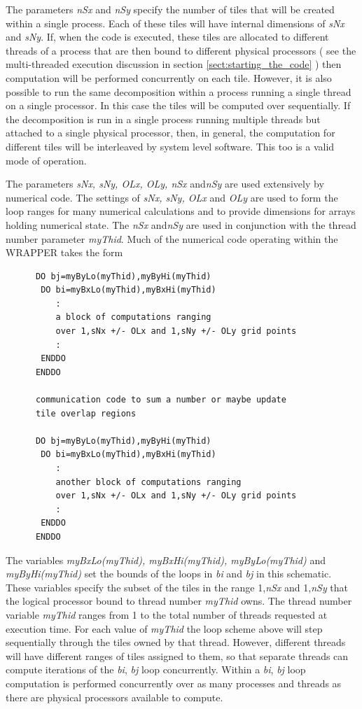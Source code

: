  The parameters {\em nSx} and {\em nSy} specify the number of tiles that will
be created within a single process. Each of these tiles will have internal
dimensions of {\em sNx} and {\em sNy}. If, when the code is executed, these tiles are 
allocated to different threads of a process that are then bound to
different physical processors ( see the multi-threaded
execution discussion in section \ref{sect:starting_the_code} ) then
computation will be performed concurrently on each tile. However, it is also
possible to run the same decomposition within a process running a single thread on
a single processor. In this case the tiles will be computed over sequentially.
If the decomposition is run in a single process running multiple threads
but attached to a single physical processor, then, in general, the computation
for different tiles will be interleaved by system level software.
This too is a valid mode of operation.

 The parameters {\em sNx, sNy, OLx, OLy, nSx} and{\em nSy} are used extensively by
numerical code. The settings of {\em sNx, sNy, OLx} and {\em OLy}
are used to form the loop ranges for many numerical calculations and
to provide dimensions for arrays holding numerical state.
The {\em nSx} and{\em nSy} are used in conjunction with the thread number
parameter {\em myThid}. Much of the numerical code operating within the
WRAPPER takes the form 
\begin{verbatim}
      DO bj=myByLo(myThid),myByHi(myThid)
       DO bi=myBxLo(myThid),myBxHi(myThid)
          :
          a block of computations ranging 
          over 1,sNx +/- OLx and 1,sNy +/- OLy grid points
          :
       ENDDO
      ENDDO

      communication code to sum a number or maybe update
      tile overlap regions

      DO bj=myByLo(myThid),myByHi(myThid)
       DO bi=myBxLo(myThid),myBxHi(myThid)
          :
          another block of computations ranging 
          over 1,sNx +/- OLx and 1,sNy +/- OLy grid points
          :
       ENDDO
      ENDDO
\end{verbatim}
The variables {\em myBxLo(myThid), myBxHi(myThid), myByLo(myThid)} and {\em
myByHi(myThid)} set the bounds of the loops in {\em bi} and {\em bj} in this 
schematic. These variables specify the subset of the tiles in
the range 1,{\em nSx} and 1,{\em nSy} that the logical processor bound to
thread number {\em myThid} owns. The thread number variable {\em myThid} 
ranges from 1 to the total number of threads requested at execution time.
For each value of {\em myThid} the loop scheme above will step sequentially
through the tiles owned by that thread. However, different threads will
have different ranges of tiles assigned to them, so that separate threads can
compute iterations of the {\em bi}, {\em bj} loop concurrently.
Within a {\em bi}, {\em bj} loop
computation is performed concurrently over as many processes and threads
as there are physical processors available to compute.

